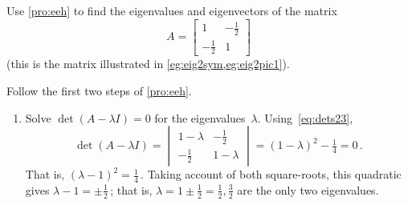 \begin{example} \label{eg:2evals}
Use \cref{pro:eeh} to find the eigenvalues and eigenvectors of the matrix
\begin{equation*}
A=\begin{bmatrix} 1&-\frac12\\-\frac12&1 \end{bmatrix}
\end{equation*}
(this is the matrix illustrated in \cref{eg:eig2sym,eg:eig2pic1}).
\begin{solution} Follow the first two steps of \cref{pro:eeh}.
\begin{enumerate}
\item Solve \(\det(A-\lambda I)=0\) for the eigenvalues~\(\lambda\).
Using~\eqref{eq:dets23},
\begin{equation*}
\det(A-\lambda I)=\begin{vmatrix} 1-\lambda&-\frac12\\
-\frac12&1-\lambda \end{vmatrix}
=(1-\lambda)^2-\tfrac14=0\,.
\end{equation*}
That is, \((\lambda-1)^2=\frac14\)\,.  Taking account of both square-roots, this quadratic gives \(\lambda-1=\pm\frac12\)\,; that is, \(\lambda=1\pm\frac12=\frac12,\frac32\) are the only two eigenvalues.


\end{enumerate}
\end{solution}
\end{example}
